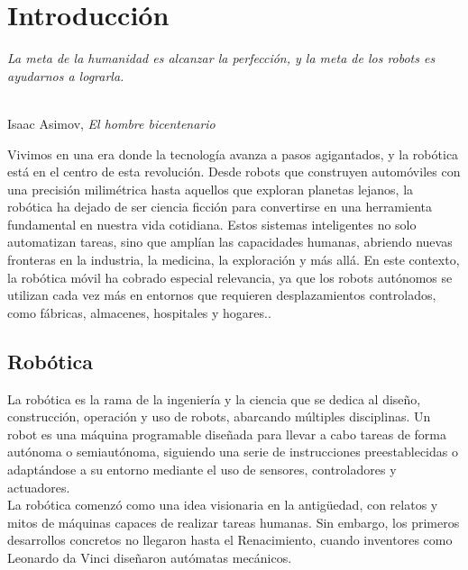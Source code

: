 \chapter{Introducción}
\label{cap:capitulo1}
\setcounter{page}{1}

\begin{flushright}
\begin{minipage}[]{10cm}
\emph{La meta de la humanidad es alcanzar la perfección, y la meta de los robots es ayudarnos a lograrla.}\\
\end{minipage}\\

Isaac Asimov, \textit{El hombre bicentenario}\\
\end{flushright}

\vspace{1cm}

Vivimos en una era donde la tecnología avanza a pasos agigantados, y la robótica está en el centro de esta revolución. Desde robots que construyen automóviles con una precisión milimétrica hasta aquellos que exploran planetas lejanos, la robótica ha dejado de ser ciencia ficción para convertirse en una herramienta fundamental en nuestra vida cotidiana. Estos sistemas inteligentes no solo automatizan tareas, sino que amplían las capacidades humanas, abriendo nuevas fronteras en la industria, la medicina, la exploración y más allá. En este contexto, la robótica móvil ha cobrado especial relevancia, ya que los robots autónomos se utilizan cada vez más en entornos que requieren desplazamientos controlados, como fábricas, almacenes, hospitales y hogares..\\

\section{Robótica}
\label{sec:miseccion} %

La robótica es la rama de la ingeniería y la ciencia que se dedica al diseño, construcción, operación y uso de robots, abarcando múltiples disciplinas. Un robot es una máquina programable diseñada para llevar a cabo tareas de forma autónoma o semiautónoma, siguiendo una serie de instrucciones preestablecidas o adaptándose a su entorno mediante el uso de sensores, controladores y actuadores. \\

La robótica comenzó como una idea visionaria en la antigüedad, con relatos y mitos de máquinas capaces de realizar tareas humanas. Sin embargo, los primeros desarrollos concretos no llegaron hasta el Renacimiento, cuando inventores como Leonardo da Vinci diseñaron autómatas mecánicos. \\

